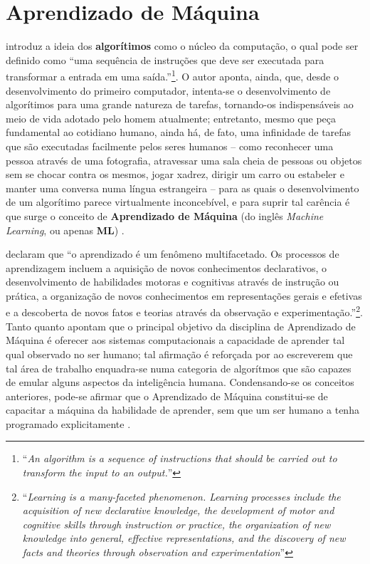 \section{Aprendizado de Máquina}
\label{sec:ml}

 introduz a ideia dos \textbf{algorítimos} como o núcleo da computação, o qual pode ser definido como ``uma sequência de instruções que deve ser executada para transformar a entrada em uma saída.''\footnote{``\textit{An algorithm is a sequence of instructions that should be carried out to transform the input to an output.}''}. O autor aponta, ainda, que, desde o desenvolvimento do primeiro computador, intenta-se o desenvolvimento de algorítimos para uma grande natureza de tarefas, tornando-os indispensáveis ao meio de vida adotado pelo homem atualmente; entretanto, mesmo que peça fundamental ao cotidiano humano, ainda há, de fato, uma infinidade de tarefas que são executadas facilmente pelos seres humanos -- como reconhecer uma pessoa através de uma fotografia, atravessar uma sala cheia de pessoas ou objetos sem se chocar contra os mesmos, jogar xadrez, dirigir um carro ou estabeler e manter uma conversa numa língua estrangeira -- para as quais o desenvolvimento de um algorítimo parece virtualmente inconcebível, e para suprir tal carência é que surge o conceito de \textbf{Aprendizado de Máquina } (do inglês \textit{Machine Learning}, ou apenas \textbf{ML}) \cite{alpaydin2020introduction}.

 declaram que ``o aprendizado é um fenômeno multifacetado. Os processos de aprendizagem incluem a aquisição de novos conhecimentos declarativos, o desenvolvimento de habilidades motoras e cognitivas através de instrução ou prática, a organização de novos conhecimentos em representações gerais e efetivas e a descoberta de novos fatos e teorias através da observação e experimentação.''\footnote{``\textit{Learning is a many-faceted phenomenon. Learning processes include the acquisition of new declarative knowledge, the development of motor and cognitive skills through instruction or practice, the organization of new knowledge into general, effective representations, and the discovery of new facts and theories through observation and experimentation}''}. Tanto  quanto  apontam que o principal objetivo da disciplina de Aprendizado de Máquina é oferecer aos sistemas computacionais a capacidade de aprender tal qual observado no ser humano; tal afirmação é reforçada por  ao escreverem que tal área de trabalho enquadra-se numa categoria de algorítmos que são capazes de emular alguns aspectos da inteligência humana. Condensando-se os conceitos anteriores, pode-se afirmar que o Aprendizado de Máquina constitui-se de capacitar a máquina da habilidade de aprender, sem que um ser humano a tenha programado explicitamente \cite{samuel1988some}.